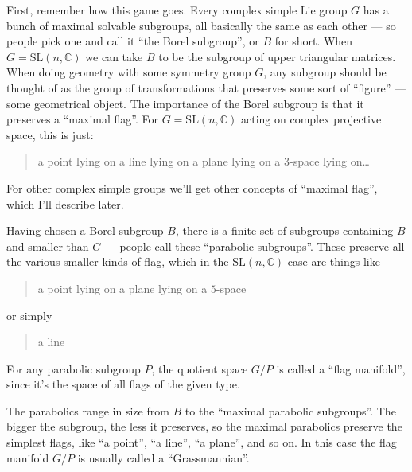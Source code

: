 \documentclass{article}
\begin{document}
First, remember how this game goes. Every complex simple Lie group \(G\)
has a bunch of maximal solvable subgroups, all basically the same as
each other --- so people pick one and call it ``the Borel subgroup'', or
\(B\) for short. When \(G = \mathrm{SL}(n,\mathbb{C})\) we can take
\(B\) to be the subgroup of upper triangular matrices. When doing
geometry with some symmetry group \(G\), any subgroup should be thought
of as the group of transformations that preserves some sort of
``figure'' --- some geometrical object. The importance of the Borel
subgroup is that it preserves a ``maximal flag''. For
\(G = \mathrm{SL}(n,\mathbb{C})\) acting on complex projective space,
this is just:

\begin{quote}
a point lying on a line lying on a plane lying on a \(3\)-space lying
on\ldots{}
\end{quote}

For other complex simple groups we'll get other concepts of ``maximal
flag'', which I'll describe later.

Having chosen a Borel subgroup \(B\), there is a finite set of subgroups
containing \(B\) and smaller than \(G\) --- people call these
``parabolic subgroups''. These preserve all the various smaller kinds of
flag, which in the \(\mathrm{SL}(n,\mathbb{C})\) case are things like

\begin{quote}
a point lying on a plane lying on a \(5\)-space
\end{quote}

or simply

\begin{quote}
a line
\end{quote}

For any parabolic subgroup \(P\), the quotient space \(G/P\) is called a
``flag manifold'', since it's the space of all flags of the given type.

The parabolics range in size from \(B\) to the ``maximal parabolic
subgroups''. The bigger the subgroup, the less it preserves, so the
maximal parabolics preserve the simplest flags, like ``a point'', ``a
line'', ``a plane'', and so on. In this case the flag manifold \(G/P\)
is usually called a ``Grassmannian''.
\end{document}
